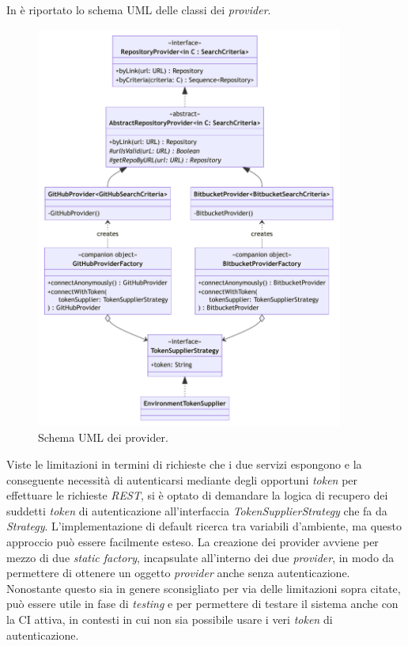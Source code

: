In  è riportato lo schema UML delle classi dei \textit{provider}.

\begin{figure}[h!]
    \centering
    \includegraphics[width=0.9\textwidth]{resources/img/02-provider.pdf}
    \caption{Schema UML dei provider.}
    \label{img:02-provider}
\end{figure}

Viste le limitazioni in termini di richieste che i due servizi espongono e la conseguente necessità di autenticarsi mediante degli opportuni \textit{token} per effettuare le richieste \textit{REST}, si è optato di demandare la logica di recupero dei suddetti \textit{token} di autenticazione all'interfaccia \textit{TokenSupplierStrategy} che fa da \textit{Strategy}.
%
%
L'implementazione di default ricerca tra variabili d'ambiente, ma questo approccio può essere facilmente esteso.
%
%
La creazione dei provider avviene per mezzo di due \textit{static factory}, incapsulate all'interno dei due \textit{provider}, in modo da permettere di ottenere un oggetto \textit{provider} anche senza autenticazione.
%
Nonostante questo sia in genere sconsigliato per via delle limitazioni sopra citate, può essere utile in fase di \textit{testing} e per permettere di testare il sistema anche con la CI attiva, in contesti in cui non sia possibile usare i veri \textit{token} di autenticazione.

